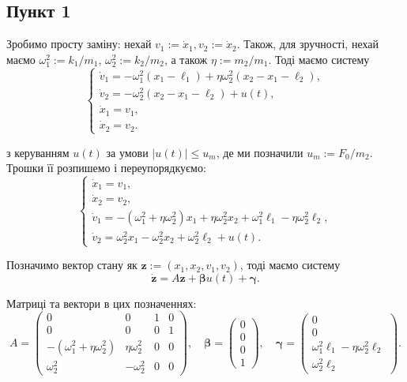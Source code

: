 \documentclass{hw_template}
\begin{document}
\subsection{Пункт 1}

Зробимо просту заміну: нехай $v_1 := \dot{x}_1, v_2 := \dot{x}_2$. Також, для зручності, нехай маємо $\omega_1^2:=k_1/m_1$, $\omega_2^2 := k_2/m_2$, а також $\eta := m_2/m_1$. Тоді маємо систему
\begin{equation*}
    \begin{cases}
        \dot{v}_1 = -\omega_1^2(x_1 - \ell_1) + \eta\omega_2^2(x_2 - x_1 - \ell_2), \\
        \dot{v}_2 = -\omega_2^2(x_2 - x_1 - \ell_2) + u(t), \\
        \dot{x}_1 = v_1, \\
        \dot{x}_2 = v_2.
    \end{cases}
\end{equation*}

з керуванням $u(t)$ за умови $|u(t)| \leq u_m$, де ми позначили $u_m := F_0/m_2$. Трошки її розпишемо і переупорядкуємо:
\begin{equation*}
    \begin{cases}
        \dot{x}_1 = v_1, \\
        \dot{x}_2 = v_2, \\
        \dot{v}_1 = -(\omega_1^2 + \eta\omega_2^2)x_1 + \eta\omega_2^2x_2 + \omega_1^2\ell_1 - \eta\omega_2^2\ell_2, \\
        \dot{v}_2 = \omega_2^2x_1 - \omega_2^2x_2 + \omega_2^2\ell_2 + u(t).
    \end{cases}
\end{equation*}

Позначимо вектор стану як $\boldsymbol{z} := (x_1,x_2,v_1,v_2)$, тоді маємо систему
\begin{equation*}
    \dot{\boldsymbol{z}} = A\boldsymbol{z} + \boldsymbol{\beta}u(t) + \boldsymbol{\gamma}.
\end{equation*}

Матриці та вектори в цих позначеннях:
\begin{equation*}
    A = \begin{pmatrix}
        0 & 0 & 1 & 0 \\
        0 & 0 & 0 & 1 \\
        -(\omega_1^2 + \eta\omega_2^2) & \eta\omega_2^2 & 0 & 0 \\
        \omega_2^2 & -\omega_2^2 & 0 & 0
    \end{pmatrix}, \quad
    \boldsymbol{\beta} = \begin{pmatrix}
        0 \\ 0 \\ 0 \\ 1
    \end{pmatrix}, \quad
    \boldsymbol{\gamma} = \begin{pmatrix}
        0 \\ 0 \\ \omega_1^2\ell_1 - \eta\omega_2^2\ell_2 \\ \omega_2^2\ell_2
    \end{pmatrix}.
\end{equation*}
\end{document}
